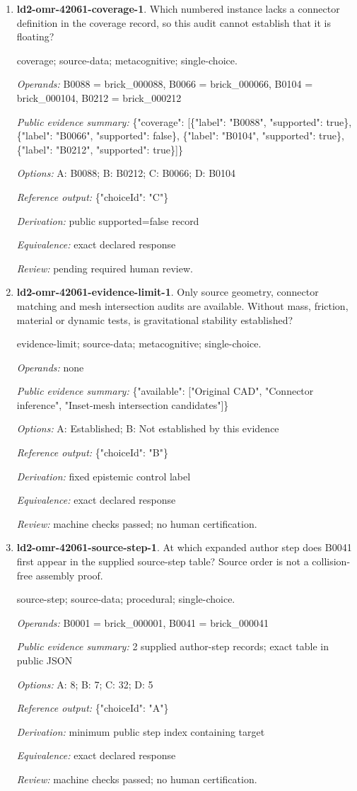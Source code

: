 \begin{enumerate}
\item \textbf{ld2-omr-42061-coverage-1}. Which numbered instance lacks a connector definition in the coverage record, so this audit cannot establish that it is floating?
\par{\small coverage; source-data; metacognitive; single-choice.\par\textit{Operands:} B0088 = brick\_000088, B0066 = brick\_000066, B0104 = brick\_000104, B0212 = brick\_000212\par\textit{Public evidence summary:} \{"coverage": [\{"label": "B0088", "supported": true\}, \{"label": "B0066", "supported": false\}, \{"label": "B0104", "supported": true\}, \{"label": "B0212", "supported": true\}]\}\par\textit{Options:} A: B0088; B: B0212; C: B0066; D: B0104\par\textit{Reference output:} \{"choiceId": "C"\}\par\textit{Derivation:} public supported=false record\par\textit{Equivalence:} exact declared response\par\textit{Review:} pending required human review.}
\item \textbf{ld2-omr-42061-evidence-limit-1}. Only source geometry, connector matching and mesh intersection audits are available. Without mass, friction, material or dynamic tests, is gravitational stability established?
\par{\small evidence-limit; source-data; metacognitive; single-choice.\par\textit{Operands:} none\par\textit{Public evidence summary:} \{"available": ["Original CAD", "Connector inference", "Inset-mesh intersection candidates"]\}\par\textit{Options:} A: Established; B: Not established by this evidence\par\textit{Reference output:} \{"choiceId": "B"\}\par\textit{Derivation:} fixed epistemic control label\par\textit{Equivalence:} exact declared response\par\textit{Review:} machine checks passed; no human certification.}
\item \textbf{ld2-omr-42061-source-step-1}. At which expanded author step does B0041 first appear in the supplied source-step table? Source order is not a collision-free assembly proof.
\par{\small source-step; source-data; procedural; single-choice.\par\textit{Operands:} B0001 = brick\_000001, B0041 = brick\_000041\par\textit{Public evidence summary:} 2 supplied author-step records; exact table in public JSON\par\textit{Options:} A: 8; B: 7; C: 32; D: 5\par\textit{Reference output:} \{"choiceId": "A"\}\par\textit{Derivation:} minimum public step index containing target\par\textit{Equivalence:} exact declared response\par\textit{Review:} machine checks passed; no human certification.}

\end{enumerate}
